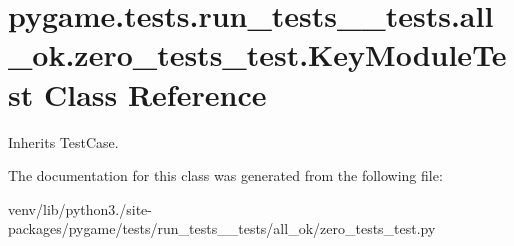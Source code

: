 \hypertarget{classpygame_1_1tests_1_1run__tests____tests_1_1all__ok_1_1zero__tests__test_1_1_key_module_test}{}\section{pygame.\+tests.\+run\+\_\+tests\+\_\+\+\_\+tests.\+all\+\_\+ok.\+zero\+\_\+tests\+\_\+test.\+Key\+Module\+Test Class Reference}
\label{classpygame_1_1tests_1_1run__tests____tests_1_1all__ok_1_1zero__tests__test_1_1_key_module_test}


Inherits Test\+Case.



The documentation for this class was generated from the following file\+:\begin{DoxyCompactItemize}
\item 
venv/lib/python3./site-\/packages/pygame/tests/run\+\_\+tests\+\_\+\+\_\+tests/all\+\_\+ok/zero\+\_\+tests\+\_\+test.\+py\end{DoxyCompactItemize}
